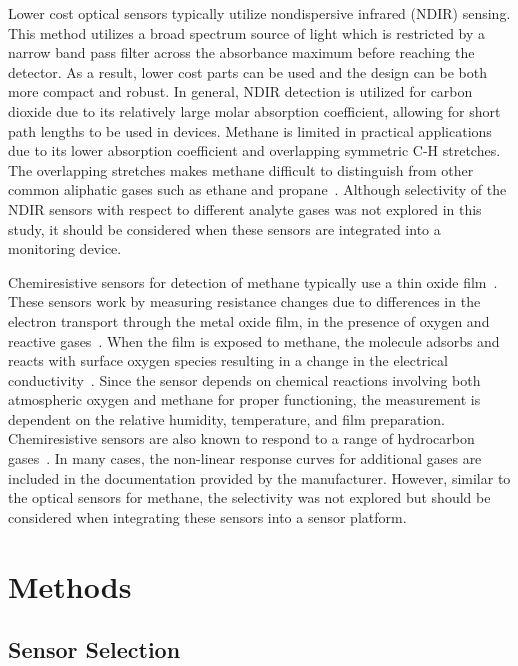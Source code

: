 \documentclass[preprint,sort&compress]{elsarticle}
\begin{document}
		Lower cost optical sensors typically utilize nondispersive infrared (NDIR) sensing.  This method utilizes a broad spectrum source of light which is restricted by a narrow band pass filter across the absorbance maximum before reaching the detector.  As a result, lower cost parts can be used and the design can be both more compact and robust.  In general, NDIR detection is utilized for carbon dioxide due to its relatively large molar absorption coefficient, allowing for short path lengths to be used in devices.  Methane is limited in practical applications due to its lower absorption coefficient and overlapping symmetric C-H stretches.  The overlapping stretches makes methane difficult to distinguish from other common aliphatic gases such as ethane and propane~\cite{coblentz_society_inc._evaluated_????}.  Although selectivity of the NDIR sensors with respect to different analyte gases was not explored in this study, it should be considered when these sensors are integrated into a monitoring device. 
		
		Chemiresistive sensors for detection of methane typically use a thin oxide film~\cite{neri_first_2015}.  These sensors work by measuring resistance changes due to differences in the electron transport through the metal oxide film, in the presence of oxygen and reactive gases~\cite{albert_cross-reactive_2000}.  When the film is exposed to methane, the molecule adsorbs and reacts with surface oxygen species resulting in a change in the electrical conductivity~\cite{wang_metal_2010,prudenziati_thick-film_1986}.  Since the sensor depends on chemical reactions involving both atmospheric oxygen and methane for proper functioning, the measurement is dependent on the relative humidity, temperature, and film preparation.  Chemiresistive sensors are also known to respond to a range of hydrocarbon gases~\cite{sekhar_development_2016}. In many cases, the non-linear response curves for additional gases are included in the documentation provided by the manufacturer.  However, similar to the optical sensors for methane, the selectivity was not explored but should be considered when integrating these sensors into a sensor platform.
	
	\section{Methods}
	\label{sec:methods}
	
		\subsection{Sensor Selection}
\end{document}
